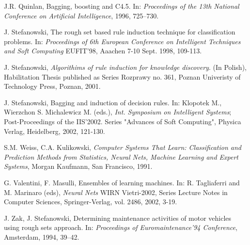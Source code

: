 \documentclass{elsart}
\begin{document}
\begin{thebibliography}{17}
 J.R. Quinlan,  Bagging, boosting and C4.5. In: {\em Proceedings
of the 13th National Conference on Artificial Intelligence}, 1996,
725--730.


 J. Stefanowski,  The rough set based rule induction
technique for classification problems. In: {\em Proceedings of 6th
European Conference on Intelligent Techniques and Soft Computing}
EUFIT'98, Aaachen 7-10 Sept. 1998, 109-113.


 J. Stefanowski,
\emph{Algorithims of rule induction for knowledge discovery}. (In
Polish), Habilitation Thesis published as Series Rozprawy no. 361,
Poznan Univeristy of Technology Press, Poznan, 2001.

 J. Stefanowski, Bagging and induction of decision rules. In:
Klopotek M., Wierzchon S. Michalewicz M. (eds.), {\em Int.
Symposium on Intelligent Systems}; Post-Proceedings of the
IIS'2002. Series "Advances of Soft Computing", Physica Verlag,
Heidelberg, 2002, 121-130.

 S.M. Weiss,  C.A. Kulikowski,
{\em Computer Systems That Learn: Classification and Prediction
Methods from Statistics, Neural Nets, Machine Learning and Expert
Systems}, Morgan Kaufmann, San Francisco, 1991.

G. Valentini, F. Masulli, Ensembles of learning machines. In: R. Tagliaferri
and M. Marinaro (eds), {\em Neural Nets} WIRN Vietri-2002, Series Lecture
Notes in Computer Sciences, Springer-Verlag, vol. 2486,  2002, 3-19.

  J. Zak, J. Stefanowski,  Determining maintenance activities of
motor vehicles using rough sets approach. In: {\em Proceedings of
Euromaintenance'94 Conference}, Amsterdam, 1994, 39--42.


\end{thebibliography}
\end{document}
